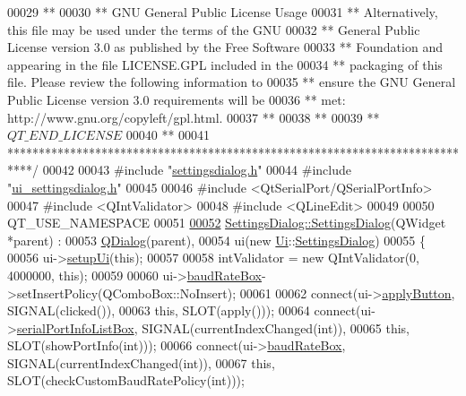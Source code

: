 \begin{DoxyCode}
00029 \textcolor{comment}{**}
00030 \textcolor{comment}{** GNU General Public License Usage}
00031 \textcolor{comment}{** Alternatively, this file may be used under the terms of the GNU}
00032 \textcolor{comment}{** General Public License version 3.0 as published by the Free Software}
00033 \textcolor{comment}{** Foundation and appearing in the file LICENSE.GPL included in the}
00034 \textcolor{comment}{** packaging of this file.  Please review the following information to}
00035 \textcolor{comment}{** ensure the GNU General Public License version 3.0 requirements will be}
00036 \textcolor{comment}{** met: http://www.gnu.org/copyleft/gpl.html.}
00037 \textcolor{comment}{**}
00038 \textcolor{comment}{**}
00039 \textcolor{comment}{** $QT\_END\_LICENSE$}
00040 \textcolor{comment}{**}
00041 \textcolor{comment}{****************************************************************************/}
00042 
00043 \textcolor{preprocessor}{#include "\hyperlink{a00132}{settingsdialog.h}"}
00044 \textcolor{preprocessor}{#include "\hyperlink{a00141}{ui\_settingsdialog.h}"}
00045 
00046 \textcolor{preprocessor}{#include <QtSerialPort/QSerialPortInfo>}
00047 \textcolor{preprocessor}{#include <QIntValidator>}
00048 \textcolor{preprocessor}{#include <QLineEdit>}
00049 
00050 QT\_USE\_NAMESPACE
00051 
\hypertarget{a00131_source_l00052}{}\hyperlink{a00075_abf4568621eef32ca85b919f2209cdc42}{00052} \hyperlink{a00075_abf4568621eef32ca85b919f2209cdc42}{SettingsDialog::SettingsDialog}(QWidget *parent) :
00053     \hyperlink{a00051}{QDialog}(parent),
00054     ui(new \hyperlink{a00145}{Ui}::\hyperlink{a00075}{SettingsDialog})
00055 \{
00056     ui->\hyperlink{a00082_a4666ab89748eeb11cdb95d857bd02c6e}{setupUi}(\textcolor{keyword}{this});
00057 
00058     intValidator = \textcolor{keyword}{new} QIntValidator(0, 4000000, \textcolor{keyword}{this});
00059 
00060     ui->\hyperlink{a00082_a766a61db4a8c72219543f7c096ae5601}{baudRateBox}->setInsertPolicy(QComboBox::NoInsert);
00061 
00062     connect(ui->\hyperlink{a00082_adc885543c05d0026019ec678b4d08c5c}{applyButton}, SIGNAL(clicked()),
00063             \textcolor{keyword}{this}, SLOT(apply()));
00064     connect(ui->\hyperlink{a00082_a323eca0d6d4b94d2d41c7737fe8b2282}{serialPortInfoListBox}, SIGNAL(currentIndexChanged(\textcolor{keywordtype}{int})),
00065             \textcolor{keyword}{this}, SLOT(showPortInfo(\textcolor{keywordtype}{int})));
00066     connect(ui->\hyperlink{a00082_a766a61db4a8c72219543f7c096ae5601}{baudRateBox}, SIGNAL(currentIndexChanged(\textcolor{keywordtype}{int})),
00067             \textcolor{keyword}{this}, SLOT(checkCustomBaudRatePolicy(\textcolor{keywordtype}{int})));

\end{DoxyCode}
